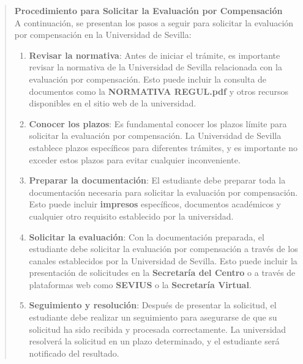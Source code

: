 \documentclass[12pt,a4paper,oneside]{report}
\begin{document}
\begin{itemize}
\begin{itemize}
\begin{quote}
\noindent\textbf{Procedimiento para Solicitar la Evaluación por Compensación}\\
A continuación, se presentan los pasos a seguir para solicitar la evaluación por compensación en la Universidad de Sevilla:
\begin{enumerate}
  \item \textbf{Revisar la normativa}: Antes de iniciar el trámite, es importante revisar la normativa de la Universidad de Sevilla relacionada con la evaluación por compensación. Esto puede incluir la consulta de documentos como la \textbf{NORMATIVA REGUL.pdf} y otros recursos disponibles en el sitio web de la universidad.
  \item \textbf{Conocer los plazos}: Es fundamental conocer los plazos límite para solicitar la evaluación por compensación. La Universidad de Sevilla establece plazos específicos para diferentes trámites, y es importante no exceder estos plazos para evitar cualquier inconveniente.
  \item \textbf{Preparar la documentación}: El estudiante debe preparar toda la documentación necesaria para solicitar la evaluación por compensación. Esto puede incluir \textbf{impresos} específicos, documentos académicos y cualquier otro requisito establecido por la universidad.
  \item \textbf{Solicitar la evaluación}: Con la documentación preparada, el estudiante debe solicitar la evaluación por compensación a través de los canales establecidos por la Universidad de Sevilla. Esto puede incluir la presentación de solicitudes en la \textbf{Secretaría del Centro} o a través de plataformas web como \textbf{SEVIUS} o la \textbf{Secretaría Virtual}.
  \item \textbf{Seguimiento y resolución}: Después de presentar la solicitud, el estudiante debe realizar un seguimiento para asegurarse de que su solicitud ha sido recibida y procesada correctamente. La universidad resolverá la solicitud en un plazo determinado, y el estudiante será notificado del resultado.
\end{enumerate}



\end{quote}
\end{itemize}
\end{itemize}
\end{document}
